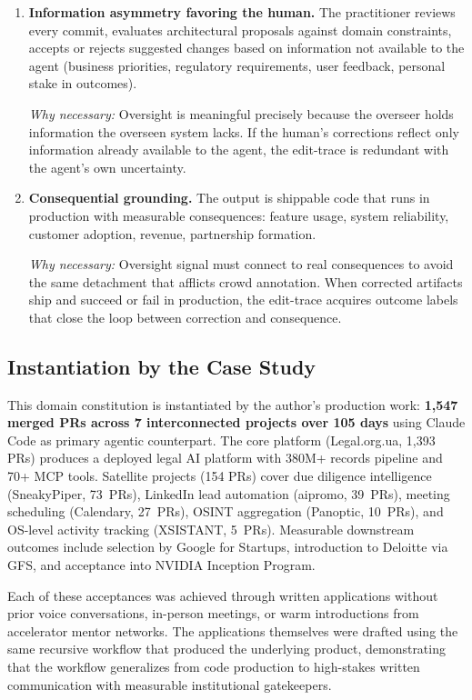 \documentclass[11pt]{article}
\begin{document}
\begin{enumerate}[label=\textbf{C\arabic*.},leftmargin=2.5em]
\item \textbf{Information asymmetry favoring the human.}
The practitioner reviews every commit, evaluates architectural proposals against domain constraints, accepts or rejects suggested changes based on information not available to the agent (business priorities, regulatory requirements, user feedback, personal stake in outcomes).

\emph{Why necessary:}
Oversight is meaningful precisely because the overseer holds information the overseen system lacks.
If the human's corrections reflect only information already available to the agent, the edit-trace is redundant with the agent's own uncertainty.

\item \textbf{Consequential grounding.}
The output is shippable code that runs in production with measurable consequences: feature usage, system reliability, customer adoption, revenue, partnership formation.

\emph{Why necessary:}
Oversight signal must connect to real consequences to avoid the same detachment that afflicts crowd annotation.
When corrected artifacts ship and succeed or fail in production, the edit-trace acquires outcome labels that close the loop between correction and consequence.

\end{enumerate}

\subsection{Instantiation by the Case Study}

This domain constitution is instantiated by the author's production work: \textbf{1{,}547 merged PRs across 7 interconnected projects over 105 days} using Claude Code as primary agentic counterpart.
The core platform (Legal.org.ua, 1{,}393 PRs) produces a deployed legal AI platform with 380M+ records pipeline and 70+ MCP tools.
Satellite projects (154 PRs) cover due diligence intelligence (SneakyPiper, 73~PRs), LinkedIn lead automation (aipromo, 39~PRs), meeting scheduling (Calendary, 27~PRs), OSINT aggregation (Panoptic, 10~PRs), and OS-level activity tracking (XSISTANT, 5~PRs).
Measurable downstream outcomes include selection by Google for Startups, introduction to Deloitte via GFS, and acceptance into NVIDIA Inception Program.

Each of these acceptances was achieved through written applications without prior voice conversations, in-person meetings, or warm introductions from accelerator mentor networks.
The applications themselves were drafted using the same recursive workflow that produced the underlying product, demonstrating that the workflow generalizes from code production to high-stakes written communication with measurable institutional gatekeepers.
\end{document}
